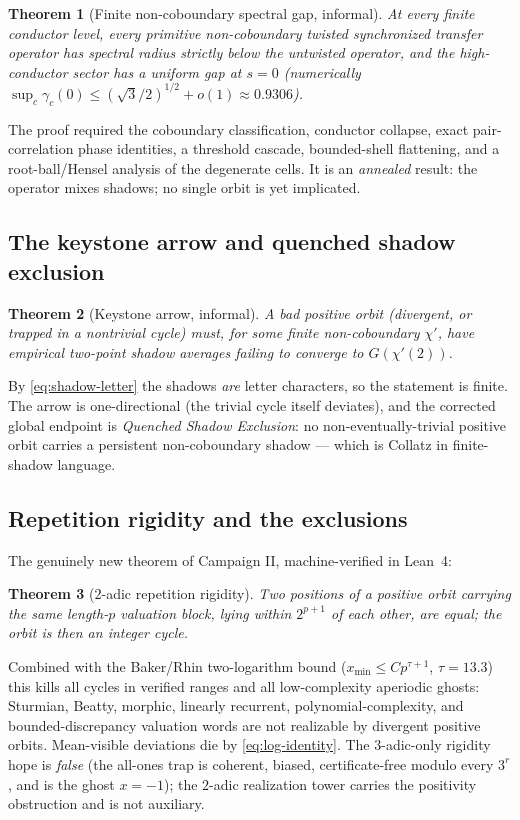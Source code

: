 \documentclass[11pt]{article}
\newtheorem{theorem}{Theorem}
\begin{document}
\begin{theorem}[Finite non-coboundary spectral gap, informal]
At every finite conductor level, every primitive non-coboundary
twisted synchronized transfer operator has spectral radius strictly
below the untwisted operator, and the high-conductor sector has a
uniform gap at $s=0$ (numerically
$\sup_c\gamma_c(0)\le(\sqrt3/2)^{1/2}+o(1)\approx0.9306$).
\end{theorem}

The proof required the coboundary classification, conductor collapse,
exact pair-correlation phase identities, a threshold cascade,
bounded-shell flattening, and a root-ball/Hensel analysis of the
degenerate cells.  It is an \emph{annealed} result: the operator mixes
shadows; no single orbit is yet implicated.

\subsection{The keystone arrow and quenched shadow exclusion}
\begin{theorem}[Keystone arrow, informal]
A bad positive orbit (divergent, or trapped in a nontrivial cycle)
must, for some finite non-coboundary $\chi'$, have empirical two-point
shadow averages failing to converge to $G(\chi'(2))$.
\end{theorem}
By \eqref{eq:shadow-letter} the shadows \emph{are} letter characters,
so the statement is finite.  The arrow is one-directional (the trivial
cycle itself deviates), and the corrected global endpoint is
\emph{Quenched Shadow Exclusion}: no non-eventually-trivial positive
orbit carries a persistent non-coboundary shadow --- which is Collatz
in finite-shadow language.

\subsection{Repetition rigidity and the exclusions}
The genuinely new theorem of Campaign II, machine-verified in
Lean~4:

\begin{theorem}[$2$-adic repetition rigidity]
Two positions of a positive orbit carrying the same length-$p$
valuation block, lying within $2^{p+1}$ of each other, are
\emph{equal}; the orbit is then an integer cycle.
\end{theorem}

Combined with the Baker/Rhin two-logarithm bound
($x_{\min}\le Cp^{\tau+1}$, $\tau=13.3$) this kills all cycles in
verified ranges and all low-complexity aperiodic ghosts: Sturmian,
Beatty, morphic, linearly recurrent, polynomial-complexity, and
bounded-discrepancy valuation words are not realizable by divergent
positive orbits.  Mean-visible deviations die by
\eqref{eq:log-identity}.  The $3$-adic-only rigidity hope is
\emph{false} (the all-ones trap is coherent, biased, certificate-free
modulo every $3^r$, and is the ghost $x=-1$); the $2$-adic
realization tower carries the positivity obstruction and is not
auxiliary.
\end{document}
